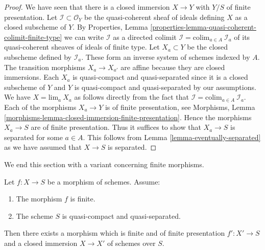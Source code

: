 \begin{proof}
We have seen that there is a closed immersion $X \to Y$ with $Y/S$ of
finite presentation. Let $\mathcal{I} \subset \mathcal{O}_Y$
be the quasi-coherent sheaf of ideals defining $X$ as a closed
subscheme of $Y$. By
Properties, Lemma \ref{properties-lemma-quasi-coherent-colimit-finite-type} 
we can write $\mathcal{I}$ as a directed colimit
$\mathcal{I} = \text{colim}_{a \in A}\ \mathcal{I}_a$ of its
quasi-coherent sheaves of ideals of finite type.
Let $X_a \subset Y$ be the closed subscheme defined by $\mathcal{I}_a$.
These form an inverse system of schemes indexed by $A$.
The transition morphisms $X_a \to X_{a'}$ are affine because
they are closed immersions. Each $X_a$ is quasi-compact and quasi-separated
since it is a closed subscheme of $Y$ and $Y$ is quasi-compact and
quasi-separated by our assumptions.
We have $X = \text{lim}_a\ X_a$ as follows directly from the
fact that $\mathcal{I} = \text{colim}_{a \in A}\ \mathcal{I}_a$.
Each of the morphisms $X_a \to Y$ is of finite presentation, see
Morphisms, Lemma \ref{morphisms-lemma-closed-immersion-finite-presentation}.
Hence the morphisms $X_a \to S$ are of finite presentation.
Thus it suffices to show that $X_a \to S$ is separated for some
$a \in A$. This follows from Lemma \ref{lemma-eventually-separated} as we have
assumed that $X \to S$ is separated.
\end{proof}

\noindent
We end this section with a variant concerning finite morphisms.

\begin{lemma}
\label{lemma-finite-closed-in-finite-finite-presentation}
Let $f : X \to S$ be a morphism of schemes.
Assume:
\begin{enumerate}
\item The morphism $f$ is finite.
\item The scheme $S$ is quasi-compact and quasi-separated.
\end{enumerate}
Then there exists a morphism which is finite and of finite presentation
$f' : X' \to S$ and a closed immersion $X \to X'$ of schemes over $S$.
\end{lemma}

